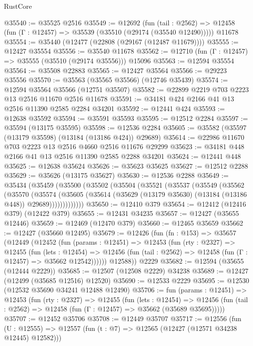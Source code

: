 \begin{lexlean}{RustCore}
\begin{coremodule}
@35540 := @35525 @2516
@35549 := @12692
    (fun (tail : @2562) => @12458 (fun (Γ : @12457) => @35539 (@35510 (@29174 (@35540 @12490)))))
    @11678
@35554 := @35440 (@12477 (@22808 (@29167 (@12487 @11679))))
@35555 := @12427 @35554
@35556 := @35540 @11678
@35562 := @12710 (fun (Γ : @12457) => @35555 (@35510 (@29174 @35556))) @15096
@35563 := @12594 @35554
@35564 := @35508 @22883
@35565 := @12427 @35564
@35566 := @29223 @35556
@35570 := @35563 (@35565 @35566) (@12746 @35439)
@35574 := @12594 @35564 @35566 (@12751 @35507)
@35582 := @22899 @2219 @703 @2223 @13 @2516 @11670 @2516 @11678
@35591 := @34181 @424 @2166 @41 @13 @2516 @11390 @2585 @2284 @34201
@35592 := @12441 @424
@35593 := @12638 @35592
@35594 := @35591 @35593
@35595 := @12512 @2284
@35597 := @35594 (@13175 @35595)
@35598 := @12536 @2284
@35605 := @35582 (@35597 (@13179 @35598) (@13184 (@13186 @424)) @29689)
@35614 := @22986 @11670 @703 @2223 @13 @2516 @4660 @2516 @11676 @29299
@35623 := @34181 @448 @2166 @41 @13 @2516 @11390 @2585 @2288 @34201
@35624 := @12441 @448
@35625 := @12638 @35624
@35626 := @35623 @35625
@35627 := @12512 @2288
@35629 := @35626 (@13175 @35627)
@35630 := @12536 @2288
@35649 := @35434
    (@35459
      (@35500
        (@35502
          (@35504
            (@35521
              (@35537
                (@35549
                  (@35562
                    (@35570
                      (@35574
                        (@35605
                          (@35614 (@35629 (@13179 @35630) (@13184 (@13186 @448)) @29689)))))))))))))
@35650 := @12410 @379
@35654 := @12412 (@12416 @379) (@12422 @379)
@35655 := @12431 @34235
@35657 := @12427 (@35655 @12446)
@35659 := @12469 (@12470 @379)
@35660 := @12465 @35659
@35662 := @12427 (@35660 @12495)
@35679 := @12426
    (fun (fn : @153) =>
    @35657
      (@12449
        (@12452
          (fun (params : @12451) =>
          @12453
            (fun (rty : @2327) =>
            @12455
              (fun (lets : @12454) =>
              @12456 (fun (tail : @2562) => @12458 (fun (Γ : @12457) => @35662 @12542))))))
        @12588))
    @2229
@35682 := @12594 (@35655 (@12444 @2229))
@35685 := @12507 (@12508 @2229) @34238
@35689 := @12427 (@12499 (@35685 @12516) @12520)
@35690 := @12533 @2229
@35695 := @12530 (@12532 @35690 @34241 @12488 @12490)
@35706 := fun (params : @12451) =>
  @12453
    (fun (rty : @2327) =>
    @12455
      (fun (lets : @12454) =>
      @12456 (fun (tail : @2562) => @12458 (fun (Γ : @12457) => @35662 (@35689 @35695)))))
@35707 := @12452 @35706
@35708 := @12449 @35707
@35717 := @12556
    (fun (U : @12555) => @12557 (fun (t : @7) => @12565 (@12427 (@12571 @34238 @12445) @12582)))

\end{coremodule}
\end{lexlean}
